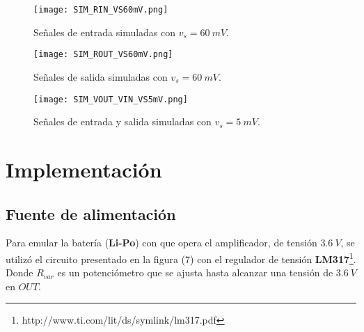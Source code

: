 \documentclass[a4paper, 10pt, spanish]{article}
\numberwithin{equation}{section}
\numberwithin{table}{section}
\begin{document}
\begin{figure}[H]
    \centering
    \texttt{[image: SIM\_RIN\_VS60mV.png]}
    \caption{Señales de entrada simuladas con $v_s = 60\ mV$.}
\end{figure}

\begin{figure}[H]
    \centering
    \texttt{[image: SIM\_ROUT\_VS60mV.png]}
    \caption{Señales de salida simuladas con $v_s = 60\ mV$.}
\end{figure}

\begin{figure}[H]
    \centering
    \texttt{[image: SIM\_VOUT\_VIN\_VS5mV.png]}
    \caption{Señales de entrada y salida simuladas con $v_s = 5\ mV$.}
\end{figure}


\newpage
\section{Implementación}

\subsection{Fuente de alimentación}
Para emular la batería (\textbf{Li-Po}) con que opera el amplificador, de tensión $3.6\ V$, se utilizó el circuito presentado en la figura (7) con el regulador de tensión \textbf{LM317}\footnote{http://www.ti.com/lit/ds/symlink/lm317.pdf}. Donde $R_{var}$ es un potenciómetro que se ajusta hasta alcanzar una tensión de $3.6\ V$ en $OUT$.
\end{document}
